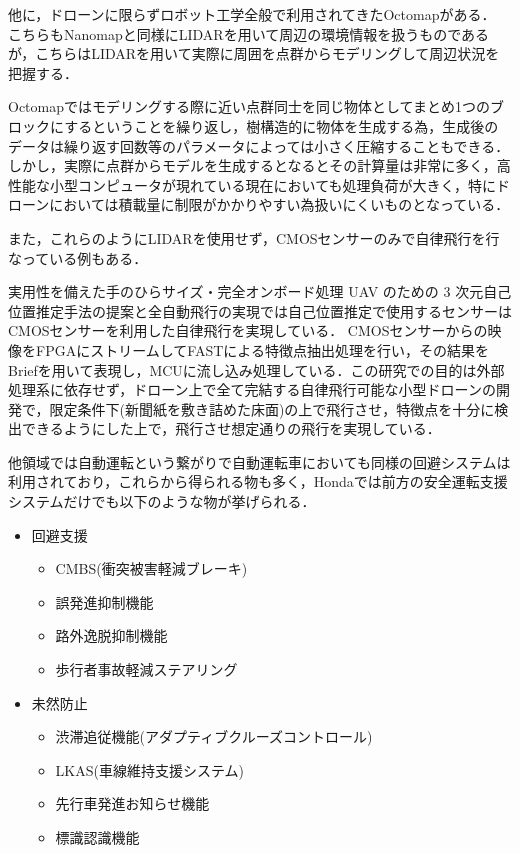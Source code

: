 \documentclass[a4j,10pt]{jsarticle}
\begin{document}
他に，ドローンに限らずロボット工学全般で利用されてきたOctomap\cite{Octomap}がある．
こちらもNanomapと同様にLIDARを用いて周辺の環境情報を扱うものであるが，こちらはLIDARを用いて実際に周囲を点群からモデリングして周辺状況を把握する．

Octomapではモデリングする際に近い点群同士を同じ物体としてまとめ1つのブロックにするということを繰り返し，樹構造的に物体を生成する為，生成後のデータは繰り返す回数等のパラメータによっては小さく圧縮することもできる．
しかし，実際に点群からモデルを生成するとなるとその計算量は非常に多く，高性能な小型コンピュータが現れている現在においても処理負荷が大きく，特にドローンにおいては積載量に制限がかかりやすい為扱いにくいものとなっている．

また，これらのようにLIDARを使用せず，CMOSセンサーのみで自律飛行を行なっている例もある．

実用性を備えた手のひらサイズ・完全オンボード処理 UAV のための 3 次元自己位置推定手法の提案と全自動飛行の実現\cite{SfMDrone}では自己位置推定で使用するセンサーはCMOSセンサーを利用した自律飛行を実現している．
CMOSセンサーからの映像をFPGAにストリームしてFAST\cite{FAST}による特徴点抽出処理を行い，その結果をBrief\cite{Brief}を用いて表現し，MCUに流し込み処理している．この研究での目的は外部処理系に依存せず，ドローン上で全て完結する自律飛行可能な小型ドローンの開発で，限定条件下(新聞紙を敷き詰めた床面)の上で飛行させ，特徴点を十分に検出できるようにした上で，飛行させ想定通りの飛行を実現している．

他領域では自動運転という繋がりで自動運転車においても同様の回避システムは利用されており，これらから得られる物も多く，Honda\cite{Honda}では前方の安全運転支援システムだけでも以下のような物が挙げられる．
\begin{itemize}
\item 回避支援
  \begin{itemize}
    \item CMBS(衝突被害軽減ブレーキ)
    \item 誤発進抑制機能
    \item 路外逸脱抑制機能
    \item 歩行者事故軽減ステアリング
  \end{itemize}
\item 未然防止
  \begin{itemize}
    \item 渋滞追従機能(アダプティブクルーズコントロール)
    \item LKAS(車線維持支援システム)
    \item 先行車発進お知らせ機能
    \item 標識認識機能
  \end{itemize}
\end{itemize}
\end{document}

